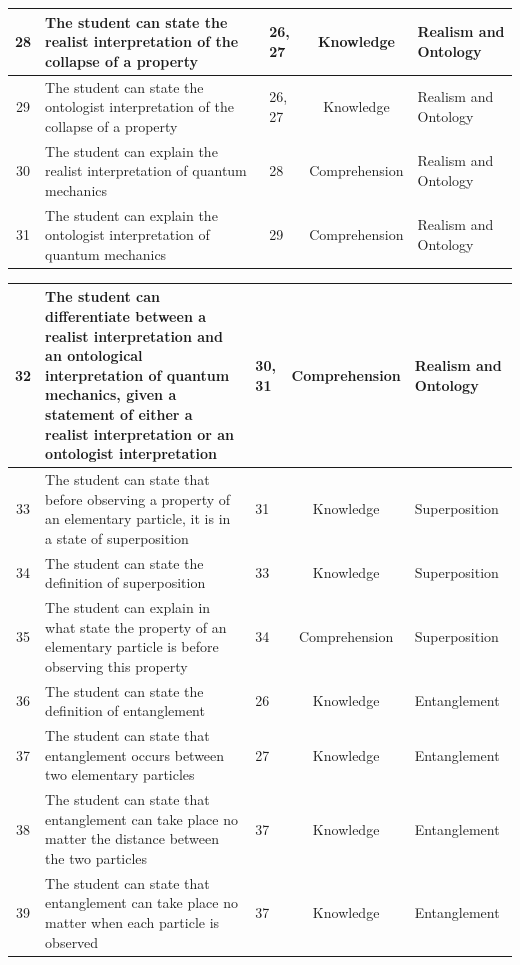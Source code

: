 \documentclass[11pt,twoside]{report} %
\begin{document}
\begin{table}[htbp]
\begin{center}
\begin{tabular}{|c|p{5cm}|p{1.5cm}|c|p{3cm}|}
28 & The student can state the realist interpretation of the collapse of a property & 26, 27 & Knowledge & Realism and Ontology \\ \hline
29 & The student can state the ontologist interpretation of the collapse of a property & 26, 27 & Knowledge & Realism and Ontology \\ \hline
30 & The student can explain the realist interpretation of quantum mechanics & 28 & Comprehension & Realism and Ontology \\ \hline
31 & The student can explain the ontologist interpretation of quantum mechanics & 29 & Comprehension & Realism and Ontology \\ \hline
\end{tabular}
\end{center}
\end{table}
\begin{table}[htbp]
\small
\begin{center}
\begin{tabular}{|c|p{5cm}|p{1.5cm}|c|p{3cm}|}
\hline
32 & The student can differentiate between a realist interpretation and an ontological interpretation of quantum mechanics, given a statement of either a realist interpretation or an ontologist interpretation & 30, 31 & Comprehension & Realism and Ontology \\ \hline
33 & The student can state that before observing a property of an elementary particle, it is in a state of superposition & 31 & Knowledge & Superposition \\ \hline
34 & The student can state the definition of superposition & 33 & Knowledge & Superposition \\ \hline
35 & The student can explain in what state the property of an elementary particle is before observing this property & 34 & Comprehension & Superposition \\ \hline
36 & The student can state the definition of entanglement & 26 & Knowledge & Entanglement \\ \hline
37 & The student can state that entanglement occurs between two elementary particles & 27 & Knowledge & Entanglement \\ \hline
38 & The student can state that entanglement can take place no matter the distance between the two particles & 37 & Knowledge & Entanglement \\ \hline
39 & The student can state that entanglement can take place no matter when each particle is observed & 37 & Knowledge & Entanglement \\ \hline

\end{tabular}
\end{center}
\end{table}
\end{document}
